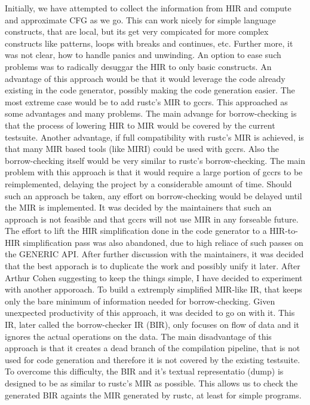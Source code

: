 Initially, we have attempted to collect the information from HIR and
compute and approximate CFG as we go. This can work nicely for simple
language constructs, that are local, but its get very compicated for
more complex constructs like patterns, loops with breaks and continues,
etc. Further more, it was not clear, how to handle panics and unwinding.
An option to ease such problems was to radically desuggar the HIR to
only basic constructs. An advantage of this approach would be that it
would leverage the code already existing in the code generator, possibly
making the code generation easier. The most extreme case would be to add
rustc's MIR to gccrs. This approached as some advantages and many
problems. The main advange for borrow-checking is that the process of
lowering HIR to MIR would be covered by the current testsuite. Another
advantage, if full compatibility with rustc's MIR is achieved, is that
many MIR based tools (like MIRI) could be used with gccrs. Also the
borrow-checking itself would be very similar to rustc's borrow-checking.
The main problem with this approach is that it would require a large
portion of gccrs to be reimplemented, delaying the project by a
considerable amount of time. Should such an approach be taken, any
effort on borrow-checking would be delayed until the MIR is implemented.
It was decided by the maintainers that such an approach is not feasible
and that gccrs will not use MIR in any forseable future. The effort to
lift the HIR simplification done in the code generator to a HIR-to-HIR
simplification pass was also abandoned, due to high reliace of such
passes on the GENERIC API. After further discussion with the
maintainers, it was decided that the best apporach is to duplicate the
work and possibly unify it later. After Arthur Cohen suggesting to keep
the things simple, I have decided to experiment with another apporoach.
To build a extremply simplified MIR-like IR, that keeps only the bare
minimum of information needed for borrow-checking. Given unexpected
productivity of this approach, it was decided to go on with it. This IR,
later called the borrow-checker IR (BIR), only focuses on flow of data
and it ignores the actual operations on the data. The main disadvantage
of this approach is that it creates a dead branch of the compilation
pipeline, that is not used for code generation and therefore it is not
covered by the existing testsuite. To overcome this difficulty, the BIR
and it's textual representatio (dump) is designed to be as similar to
rustc's MIR as possible. This allows us to check the generated BIR
againts the MIR generated by rustc, at least for simple programs.


